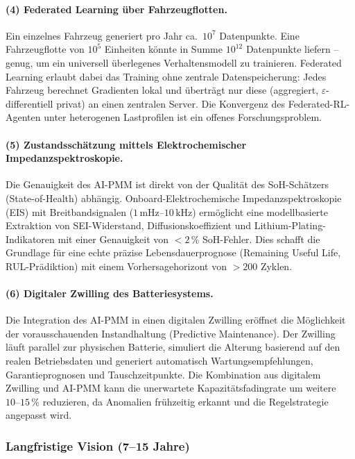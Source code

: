 ﻿\documentclass[12pt,a4paper]{article}
\begin{document}
	\paragraph{(4) Federated Learning über Fahrzeugflotten.}
	Ein einzelnes Fahrzeug generiert pro Jahr ca.\ $10^7$ Datenpunkte.
	Eine Fahrzeugflotte von $10^5$ Einheiten könnte in Summe $10^{12}$
	Datenpunkte liefern -- genug, um ein universell überlegenes Verhaltensmodell
	zu trainieren. Federated Learning erlaubt dabei das Training ohne zentrale
	Datenspeicherung: Jedes Fahrzeug berechnet Gradienten lokal und überträgt
	nur diese (aggregiert, $\varepsilon$-differentiell privat) an einen
	zentralen Server. Die Konvergenz des Federated-RL-Agenten unter
	heterogenen Lastprofilen ist ein offenes Forschungsproblem.
	
	\paragraph{(5) Zustandsschätzung mittels Elektrochemischer Impedanzspektroskopie.}
	Die Genauigkeit des AI-PMM ist direkt von der Qualität des SoH-Schätzers
	(State-of-Health) abhängig. Onboard-Elektrochemische Impedanzspektroskopie
	(EIS) mit Breitbandsignalen ($1\,\mathrm{mHz}\text{--}10\,\mathrm{kHz}$)
	ermöglicht eine modellbasierte Extraktion von SEI-Widerstand, Diffusionskoeffizient
	und Lithium-Plating-Indikatoren mit einer Genauigkeit von $< 2\,\%$ SoH-Fehler.
	Dies schafft die Grundlage für eine echte präzise Lebensdauerprognose
	(Remaining Useful Life, RUL-Prädiktion) mit einem Vorhersagehorizont von
	$> 200$ Zyklen.
	
	\paragraph{(6) Digitaler Zwilling des Batteriesystems.}
	Die Integration des AI-PMM in einen digitalen Zwilling eröffnet die
	Möglichkeit der vorausschauenden Instandhaltung (Predictive Maintenance).
	Der Zwilling läuft parallel zur physischen Batterie, simuliert die Alterung
	basierend auf den realen Betriebsdaten und generiert automatisch
	Wartungsempfehlungen, Garantieprognosen und Tauschzeitpunkte. Die Kombination
	aus digitalem Zwilling und AI-PMM kann die unerwartete Kapazitätsfadingrate
	um weitere $10\text{--}15\,\%$ reduzieren, da Anomalien frühzeitig erkannt
	und die Regelstrategie angepasst wird.
	
	\subsubsection{Langfristige Vision (7--15 Jahre)}
	
\end{document}
